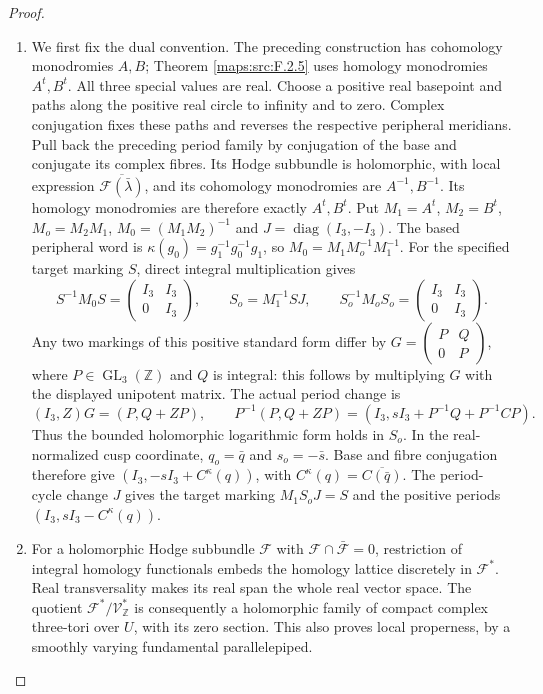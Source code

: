 \documentclass[11pt,a4paper]{article}
\theoremstyle{definition}
\begin{document}
\begin{proof}
\begin{enumerate}[label=\arabic*.]
\item We first fix the dual convention.  The preceding construction
has cohomology monodromies $A,B$; Theorem \ref{maps:src:F.2.5} uses homology
monodromies $A^t,B^t$.  All three special values are real.
Choose a positive real basepoint and paths along the positive
real circle to infinity and to zero.  Complex conjugation fixes
these paths and reverses the respective peripheral meridians.
Pull back the preceding period family by conjugation of the
base and conjugate its complex fibres.  Its Hodge subbundle is
holomorphic, with local expression
$\overline{\mathcal F(\bar\lambda)}$, and its cohomology
monodromies are $A^{-1},B^{-1}$.  Its homology monodromies are
therefore exactly $A^t,B^t$.
Put $M_1=A^t$, $M_2=B^t$, $M_o=M_2M_1$, $M_0=(M_1M_2)^{-1}$ and
$J=\operatorname{diag}(I_3,-I_3)$.  The based peripheral word is
$\kappa(g_0)=g_1^{-1}g_0^{-1}g_1$, so
$M_0=M_1M_o^{-1}M_1^{-1}$.  For the specified target marking $S$,
direct integral multiplication gives
\[
 S^{-1}M_0S=\begin{pmatrix}I_3&I_3\\0&I_3\end{pmatrix},\qquad
 S_o=M_1^{-1}SJ,\qquad
 S_o^{-1}M_oS_o=\begin{pmatrix}I_3&I_3\\0&I_3\end{pmatrix}.
\]
Any two markings of this positive standard form differ by
$G=\left(\begin{smallmatrix}P&Q\\0&P\end{smallmatrix}\right)$,
where $P\in\operatorname{GL}_3(\mathbb Z)$ and $Q$ is integral:
this follows by multiplying $G$ with the displayed unipotent
matrix.  The actual period change is
\[
 (I_3,Z)G=(P,Q+ZP),\qquad
 P^{-1}(P,Q+ZP)
  =(I_3,sI_3+P^{-1}Q+P^{-1}CP).
\]
Thus the bounded holomorphic logarithmic form holds in $S_o$.
In the real-normalized cusp coordinate,
$q_o=\bar q$ and $s_o=-\bar s$.
Base and fibre conjugation therefore give
$(I_3,-sI_3+C^\kappa(q))$, with
$C^\kappa(q)=\overline{C(\bar q)}$.
The period-cycle change $J$ gives the target marking
$M_1S_oJ=S$ and the positive periods
$(I_3,sI_3-C^\kappa(q))$.


\item For a holomorphic Hodge subbundle $\mathcal F$ with
$\mathcal F\cap\bar{\mathcal F}=0$, restriction of integral
homology functionals embeds the homology lattice discretely in
$\mathcal F^*$.  Real transversality makes its real span the
whole real vector space.  The quotient
$\mathcal F^*/\mathcal V_{\mathbb Z}^*$ is consequently a
holomorphic family of compact complex three-tori over $U$,
with its zero section.  This also proves local properness,
by a smoothly varying fundamental parallelepiped.


\end{enumerate}
\end{proof}
\end{document}
